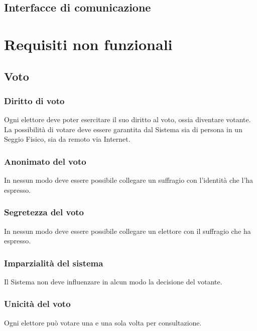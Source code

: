 \documentclass{report}
\begin{document}
\subsection{Interfacce di comunicazione}




\section{Requisiti non funzionali}


\subsection{Voto}

\subsubsection{Diritto di voto}
Ogni elettore deve poter esercitare il suo diritto al voto, ossia diventare votante. La possibilità di votare deve essere garantita dal Sistema sia di persona in un Seggio Fisico, sia da remoto via Internet.

\subsubsection{Anonimato del voto}
In nessun modo deve essere possibile collegare un suffragio con l'identità che l'ha espresso.

\subsubsection{Segretezza del voto}
In nessun modo deve essere possibile collegare un elettore con il suffragio che ha espresso.

\subsubsection{Imparzialità del sistema}
Il Sistema non deve influenzare in alcun modo la decisione del votante.

\subsubsection{Unicità del voto}
Ogni elettore può votare una e una sola volta per consultazione.
\end{document}
